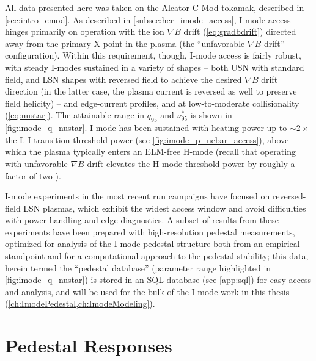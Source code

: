 
All data presented here was taken on the Alcator C-Mod tokamak, described in \cref{sec:intro_cmod}.  As described in \cref{subsec:hcr_imode_access}, I-mode access hinges primarily on operation with the ion $\nabla B$ drift (\cref{eq:gradbdrift}) directed away from the primary X-point in the plasma (the ``unfavorable $\nabla B$ drift'' configuration).  Within this requirement, though, I-mode access is fairly robust, with steady I-modes sustained in a variety of shapes -- both USN with standard field, and LSN shapes with reversed field to achieve the desired $\nabla B$ drift direction (in the latter case, the plasma current is reversed as well to preserve field helicity) -- and edge-current profiles, and at low-to-moderate collisionality (\cref{eq:nustar}).  The attainable range in $q_{95}$ and $\nu^*_{95}$ is shown in \cref{fig:imode_q_nustar}.  I-mode has been sustained with heating power up to $\sim 2 \times$ the L-I transition threshold power (see \cref{fig:imode_p_nebar_access}), above which the plasma typically enters an ELM-free H-mode (recall that operating with unfavorable $\nabla B$ drift elevates the H-mode threshold power by roughly a factor of two \cite{Suttrop2003,Carlstrom1998,Groebner1998}).

I-mode experiments in the most recent run campaigns have focused on reversed-field LSN plasmas, which exhibit the widest access window and avoid difficulties with power handling and edge diagnostics.  A subset of results from these experiments have been prepared with high-resolution pedestal measurements, optimized for analysis of the I-mode pedestal structure both from an empirical standpoint and for a computational approach to the pedestal stability; this data, herein termed the ``pedestal database'' (parameter range highlighted in \cref{fig:imode_q_nustar}) is stored in an SQL database (see \cref{app:sql}) for easy access and analysis, and will be used for the bulk of the I-mode work in this thesis (\cref{ch:ImodePedestal,ch:ImodeModeling}).\nicesectionending

\section{Pedestal Responses}\label{sec:imode_height}

